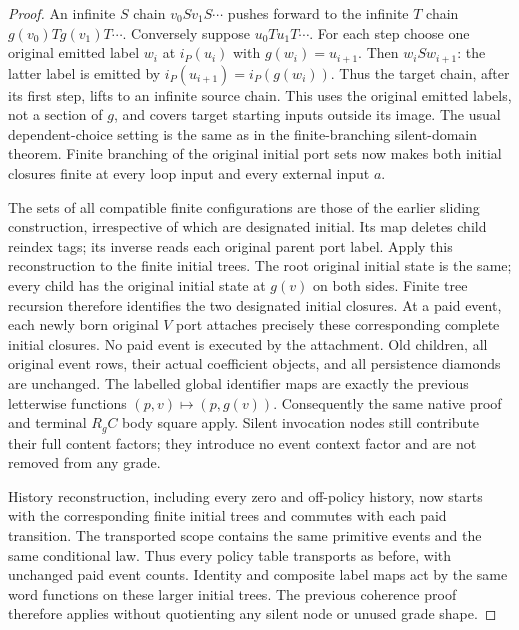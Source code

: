 \documentclass[11pt]{article}
\begin{document}
\begin{proof}
An infinite $S$ chain $v_0 S v_1 S\cdots$ pushes forward to the infinite
$T$ chain $g(v_0)Tg(v_1)T\cdots$. Conversely suppose $u_0Tu_1T\cdots$.
For each step choose one original emitted label $w_i$ at $i_P(u_i)$ with
$g(w_i)=u_{i+1}$. Then $w_i S w_{i+1}$: the latter label is emitted by
$i_P(u_{i+1})=i_P(g(w_i))$. Thus the target chain, after its first step,
lifts to an infinite source chain. This uses the original emitted labels,
not a section of $g$, and covers target starting inputs outside its image.
The usual dependent-choice setting is the same as in the finite-branching
silent-domain theorem. Finite branching of the original initial port sets
now makes both initial closures finite at every loop input and every
external input $a$.

The sets of all compatible finite configurations are those of the earlier
sliding construction, irrespective of which are designated initial.
Its map deletes child reindex tags; its inverse reads each original
parent port label. Apply this reconstruction to the finite initial trees.
The root original initial state is the same; every child has the original
initial state at $g(v)$ on both sides. Finite tree recursion therefore
identifies the two designated initial closures. At a paid event, each newly
born original $V$ port attaches precisely these corresponding complete
initial closures. No paid event is executed by the attachment. Old children,
all original event rows, their actual coefficient objects, and all
persistence diamonds are unchanged. The labelled global identifier maps
are exactly the previous letterwise functions $(p,v)\mapsto(p,g(v))$.
Consequently the same native proof and terminal $R_g C$ body square apply.
Silent invocation nodes still contribute their full content factors; they
introduce no event context factor and are not removed from any grade.

History reconstruction, including every zero and off-policy history,
now starts with the corresponding finite initial trees and commutes with
each paid transition. The transported scope contains the same primitive
events and the same conditional law. Thus every policy table transports
as before, with unchanged paid event counts. Identity and composite label
maps act by the same word functions on these larger initial trees. The
previous coherence proof therefore applies without quotienting any silent
node or unused grade shape.
\end{proof}
\end{document}
